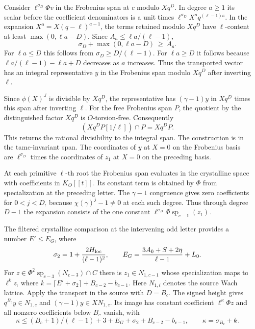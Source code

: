Consider \(\ell^{\sigma_D}\Phi v\)
in the Frobenius span at \(c\) modulo \(Xq^D\).
In degree \(a\ge1\) its scalar before the coefficient denominators
is a unit times \(\ell^{\sigma_D}X^a q^{(\ell-1)a}\).
In the expansion \(X^a=X(q-\ell)^{a-1}\), the terms retained
modulo \(Xq^D\) have \(\ell\)-content at least
\(\max(0,\ell a-D)\). Since \(A_a\le\ell a/(\ell-1)\),
\[
 \sigma_D+\max(0,\ell a-D)\ \ge\ A_a .
\]
For \(\ell a\le D\) this follows from
\(\sigma_D\ge D/(\ell-1)\). For \(\ell a\ge D\) it
follows because \(\ell a/(\ell-1)-\ell a+D\) decreases
as \(a\) increases. Thus the transported vector has an
integral representative \(y\) in the Frobenius span modulo
\(Xq^D\) after inverting \(\ell\).

Since \(\phi(X)^J\) is divisible by \(Xq^D\), the representative
has \((\gamma-1)y\) in \(Xq^D\) times this span after inverting
\(\ell\). For the free Frobenius span \(P\), the quotient by the distinguished factor \(Xq^D\) is \(O\)-torsion-free. Consequently
\[
 (Xq^D P[1/\ell])\cap P=Xq^D P.
\]
This returns the rational divisibility to the integral span.
The construction is in the tame-invariant span. The coordinates
of \(y\) at \(X=0\) on the Frobenius basis are
\(\ell^{\sigma_D}\) times the coordinates of \(z_1\) at \(X=0\)
on the preceding basis.

At each primitive \(\ell\)-th root the
Frobenius span evaluates in the crystalline space with
coefficients in \(K_O[[t]]\). Its constant term is obtained
by \(\Phi\) from specialization at the preceding letter.
The \(\gamma-1\) congruence gives zero coefficients for
\(0<j<D\), because
\(\chi(\gamma)^j-1\ne0\) at each such degree.
Thus through degree \(D-1\) the expansion consists of the one
constant \(\ell^{\sigma_D}\Phi\operatorname{sp}_{c-1}(z_1)\).

The filtered crystalline comparison at the intervening odd letter
provides a number \(E'\le E_G\), where
\[
\sigma_2=1+\frac{2H_{\rm loc}}{(\ell-1)^2},\qquad
E_G=\frac{3A_0+S+2\eta}{\ell-1}+L_0 .
\]
For \(z\in \Phi^2\operatorname{sp}_{c-3}(N_{c-3})\cap C\) there
is \(z_1\in N_{1,c-1}\) whose specialization maps to \(\ell^k z\),
where \(k=\lceil E'+\sigma_2\rceil+B_{c-2}-b_{c-1}\).
Here \(N_{1,i}\) denotes the source Wach lattice.
Apply the transport in the source with \(D=B_c\).
The signed height gives \(q^{B_c}y\in N_{1,c}\) and
\((\gamma-1)y\in XN_{1,c}\). Its image has constant coefficient
\(\ell^\kappa\Phi z\) and all nonzero coefficients below \(B_c\)
vanish, with
\[
 \kappa\le (B_c+1)/(\ell-1)+3+E_G+\sigma_2+
                   B_{c-2}-b_{c-1},\qquad
 \kappa=\sigma_{B_c}+k.
\]

